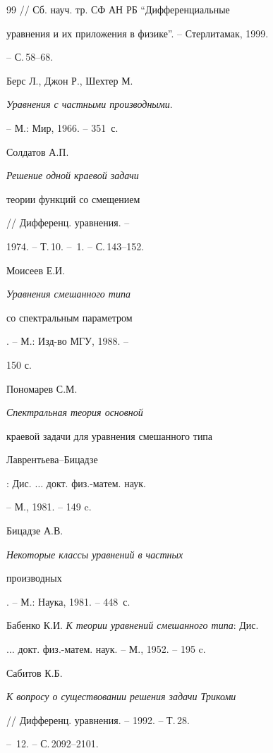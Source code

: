 \begin{thebibliography}{99}
// Сб. науч. тр. СФ АН РБ ``Дифференциальные


уравнения и их приложения в физике''. -- Стерлитамак, 1999.


-- С.\,58--68.





 Берс Л., Джон Р., Шехтер М.


{\it Уравнения с частными производными}.


-- М.: Мир, 1966. -- 351~с.





 Солдатов А.П. {\it Решение одной краевой задачи


теории функций со смещением}// Дифференц. уравнения. --


1974. -- Т.\,10. -- \No\,1. -- С.\,143--152.





 Моисеев Е.И. {\it Уравнения смешанного типа


со спектральным параметром}. -- М.: Изд-во МГУ, 1988. --


150 с.





 Пономарев С.М. {\it Спектральная теория основной


краевой задачи для уравнения смешанного типа


Лаврентьева--Бицадзе}: Дис. $\dotsc$ докт. физ.-матем. наук.


-- М., 1981. -- 149 c.





 Бицадзе А.В. {\it Некоторые классы уравнений в частных


производных}. -- М.: Наука, 1981. -- 448~с.





 Бабенко К.И. {\it К теории уравнений смешанного типа}: Дис.


$\dotsc$ докт. физ.-матем. наук. -- М., 1952. -- 195 c.





 Сабитов К.Б.


{\it К вопросу о существовании решения задачи Трикоми}


// Дифференц. уравнения. -- 1992. -- Т.\,28.


-- \No\,12. -- С.\,2092--2101.








\end{thebibliography}





